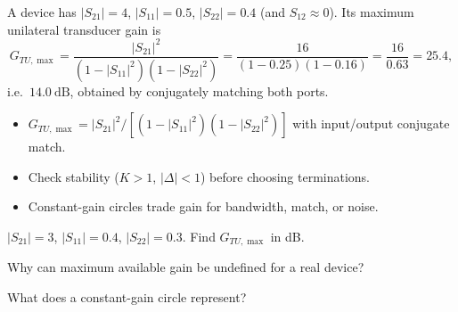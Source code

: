 \begin{workedexample}
A device has $|S_{21}| = 4$, $|S_{11}| = 0.5$, $|S_{22}| = 0.4$ (and
$S_{12}\!\approx\!0$). Its maximum unilateral transducer gain is
\[ G_{TU,\max} = \frac{|S_{21}|^2}{(1-|S_{11}|^2)(1-|S_{22}|^2)}
   = \frac{16}{(1-0.25)(1-0.16)} = \frac{16}{0.63} = 25.4, \]
i.e.\ $14.0\ \text{dB}$, obtained by conjugately matching both ports.
\end{workedexample}

\begin{keytakeaways}
\begin{itemize}[leftmargin=1.4em,itemsep=2pt]
\item $G_{TU,\max}=|S_{21}|^2/[(1-|S_{11}|^2)(1-|S_{22}|^2)]$ with input/output conjugate match.
\item Check stability ($K>1$, $|\Delta|<1$) before choosing terminations.
\item Constant-gain circles trade gain for bandwidth, match, or noise.
\end{itemize}
\end{keytakeaways}

\begin{exercises}
\item $|S_{21}| = 3$, $|S_{11}| = 0.4$, $|S_{22}| = 0.3$. Find $G_{TU,\max}$ in dB.
\item Why can maximum available gain be undefined for a real device?
\item What does a constant-gain circle represent?
\end{exercises}

